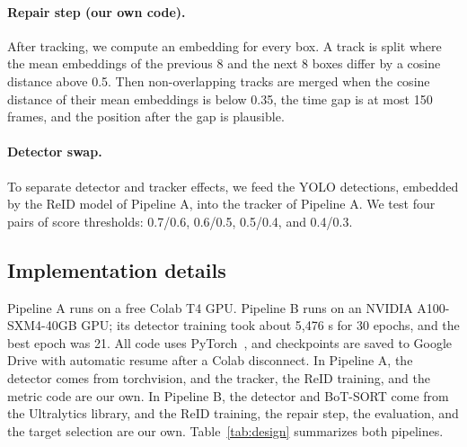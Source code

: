 \documentclass[11pt,letterpaper]{article}
\begin{document}
\paragraph{Repair step (our own code).}
After tracking, we compute an embedding for every box.
A track is split where the mean embeddings of the previous 8 and the next 8 boxes differ by a cosine distance above 0.5.
Then non-overlapping tracks are merged when the cosine distance of their mean embeddings is below 0.35, the time gap is at most 150 frames, and the position after the gap is plausible.

\paragraph{Detector swap.}
To separate detector and tracker effects, we feed the YOLO detections, embedded by the ReID model of Pipeline A, into the tracker of Pipeline A.
We test four pairs of score thresholds: 0.7/0.6, 0.6/0.5, 0.5/0.4, and 0.4/0.3.

\subsection{Implementation details}\label{sec:impl}
Pipeline A runs on a free Colab T4 GPU.
Pipeline B runs on an NVIDIA A100-SXM4-40GB GPU; its detector training took about 5,476 s for 30 epochs, and the best epoch was 21.
All code uses PyTorch~\cite{paszke2019pytorch}, and checkpoints are saved to Google Drive with automatic resume after a Colab disconnect.
In Pipeline A, the detector comes from torchvision, and the tracker, the ReID training, and the metric code are our own.
In Pipeline B, the detector and BoT-SORT come from the Ultralytics library, and the ReID training, the repair step, the evaluation, and the target selection are our own.
Table~\ref{tab:design} summarizes both pipelines.
\end{document}
